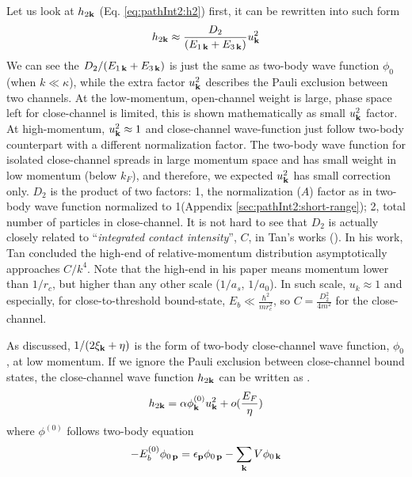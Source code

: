 Let us look at $h_{2\mathbf{k}}$ (Eq. \ref{eq:pathInt2:h2}) first, it can be rewritten into such form
\begin{equation}\label{eq:pathInt2:h2D2}
 h_{2\mathbf{k}}\approx\frac{D_{2}}{(E_{1\,\mathbf{k}}+E_{3\,\mathbf{k}})}u_{\mathbf{k}}^{2}
\end{equation}
We can see the ${D_{2}}/{(E_{1\,\mathbf{k}}+E_{3\,\mathbf{k}})}$ is just the same as two-body wave function $\phi_{0}$ (when $k\ll\kappa$), while the extra factor $u_{\mathbf{k}}^{2}$ describes the Pauli exclusion between two channels.  At the low-momentum, open-channel weight is large, phase space left for close-channel is limited, this is shown mathematically as small $u_{\mathbf{k}}^{2}$ factor.   At high-momentum, $u_{\mathbf{k}}^{2}\approx1$ and close-channel wave-function just follow two-body counterpart with a different normalization factor.   The two-body wave function for isolated close-channel spreads in large momentum space and has small weight in low momentum (below $k_{F}$), and therefore, we expected $u_{\mathbf{k}}^{2}$ has small correction only.  $D_{2}$ is the product of two factors: 1, the normalization ($A$) factor as in two-body wave function normalized to 1(Appendix \ref{sec:pathInt2:short-range}); 2, total number of particles in close-channel.  
It is not hard to see that $D_{2}$ is actually closely related to ``\emph{integrated contact intensity}'', $C$, in Tan's works (\cite{Tan2008-1,Tan2008-2}).  In his work, Tan concluded  the high-end of relative-momentum distribution asymptotically approaches  $C/k^{4}$.  Note that the high-end in his paper means momentum lower than $1/r_{c}$, but higher than any other scale ($1/a_{s}$, $1/a_{0}$).  In such scale, $u_{k}\approx1$ and especially, for close-to-threshold bound-state, $E_{b}\ll{}\frac{\hbar^{2}}{mr_{c}^{2}}$, so $C=\frac{D_{2}^{2}}{4m^{2}}$ for the close-channel.   

As discussed, $1/(2\xi_{\mathbf{k}}+\eta)$ is the form of two-body close-channel wave function, $\phi_0$, at low momentum.  If we ignore the Pauli exclusion between close-channel bound states, the close-channel wave function $h_{2\mathbf{k}}$ can be written as .
\begin{equation}
h_{2\mathbf{k}}=\alpha\phi^{(0)}_{\mathbf{k}}u_{\mathbf{k}}^{2}+o(\frac{E_{F}}{\eta})
\end{equation}
 where $\phi^{(0)}$ follows two-body \sch equation
\begin{equation}\label{eq:pathInt2:phi}
-E_{b}^{(0)}\phi_{0\,\mathbf{p}}=\epsilon_{\mathbf{p}}\phi_{0\,\mathbf{p}}-\sum_{\mathbf{k}}V \phi_{0\,\mathbf{k}}
\end{equation}

